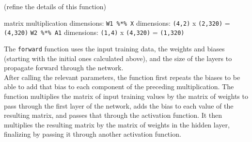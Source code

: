 \documentclass[
]{article}
\begin{document}
(refine the details of this function)

matrix multiplication dimensions: \texttt{W1\ \%*\%\ X} dimensions:
\texttt{(4,2)} x \texttt{(2,320)} = \texttt{(4,320)}
\texttt{W2\ \%*\%\ A1} dimensions: \texttt{(1,4)} x \texttt{(4,320)} =
\texttt{(1,320)}

The \texttt{forward} function uses the input training data, the weights
and biases (starting with the initial ones calculated above), and the
size of the layers to propagate forward through the network.\\
After calling the relevant parameters, the function first repeats the
biases to be able to add that bias to each component of the preceding
multiplication. The function multiplies the matrix of input training
values by the matrix of weights to pass through the first layer of the
network, adds the bias to each value of the resulting matrix, and passes
that through the activation function. It then multiplies the resulting
matrix by the matrix of weights in the hidden layer, finalizing by
passing it through another activation function.
\end{document}
